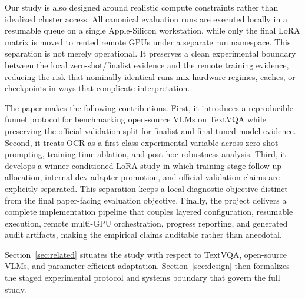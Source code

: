 Our study is also designed around realistic compute constraints rather than idealized cluster access. All canonical evaluation runs are executed locally in a resumable queue on a single Apple-Silicon workstation, while only the final LoRA matrix is moved to rented remote GPUs under a separate run namespace. This separation is not merely operational. It preserves a clean experimental boundary between the local zero-shot/finalist evidence and the remote training evidence, reducing the risk that nominally identical runs mix hardware regimes, caches, or checkpoints in ways that complicate interpretation.

The paper makes the following contributions. First, it introduces a reproducible funnel protocol for benchmarking open-source VLMs on TextVQA while preserving the official validation split for finalist and final tuned-model evidence. Second, it treats OCR as a first-class experimental variable across zero-shot prompting, training-time ablation, and post-hoc robustness analysis. Third, it develops a winner-conditioned LoRA study in which training-stage follow-up allocation, internal-dev adapter promotion, and official-validation claims are explicitly separated. This separation keeps a local diagnostic objective distinct from the final paper-facing evaluation objective. Finally, the project delivers a complete implementation pipeline that couples layered configuration, resumable execution, remote multi-GPU orchestration, progress reporting, and generated audit artifacts, making the empirical claims auditable rather than anecdotal.

Section~\ref{sec:related} situates the study with respect to TextVQA, open-source VLMs, and parameter-efficient adaptation. Section~\ref{sec:design} then formalizes the staged experimental protocol and systems boundary that govern the full study.
